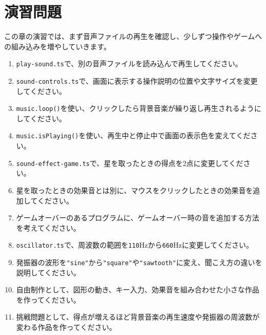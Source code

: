 \section{演習問題}

この章の演習では、まず音声ファイルの再生を確認し、少しずつ操作やゲームへの組み込みを増やしていきます。

\begin{enumerate}
    \item \texttt{play-sound.ts}で、別の音声ファイルを読み込んで再生してください。
    \item \texttt{sound-controls.ts}で、画面に表示する操作説明の位置や文字サイズを変更してください。
    \item \texttt{music.loop()}を使い、クリックしたら背景音楽が繰り返し再生されるようにしてください。
    \item \texttt{music.isPlaying()}を使い、再生中と停止中で画面の表示色を変えてください。
    \item \texttt{sound-effect-game.ts}で、星を取ったときの得点を2点に変更してください。
    \item 星を取ったときの効果音とは別に、マウスをクリックしたときの効果音を追加してください。
    \item ゲームオーバーのあるプログラムに、ゲームオーバー時の音を追加する方法を考えてください。
    \item \texttt{oscillator.ts}で、周波数の範囲を\texttt{110}Hzから\texttt{660}Hzに変更してください。
    \item 発振器の波形を\texttt{"sine"}から\texttt{"square"}や\texttt{"sawtooth"}に変え、聞こえ方の違いを説明してください。
    \item 自由制作として、図形の動き、キー入力、効果音を組み合わせた小さな作品を作ってください。
    \item 挑戦問題として、得点が増えるほど背景音楽の再生速度や発振器の周波数が変わる作品を作ってください。
\end{enumerate}
